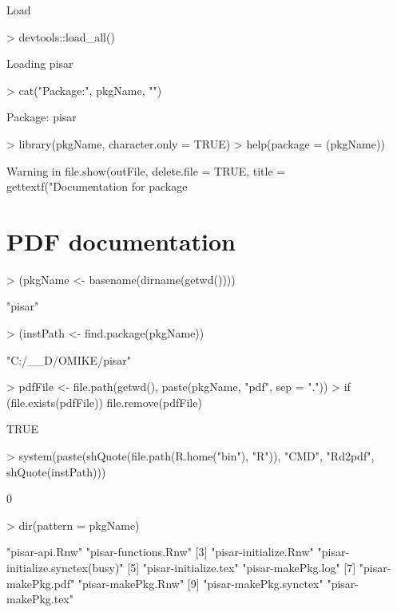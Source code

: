 \documentclass[a4paper,12pt]{article}\usepackage[]{graphicx}\usepackage[]{color}
\begin{document}
Load
\begin{Schunk}
\begin{Sinput}
> devtools::load_all()
\end{Sinput}
\begin{Soutput}
Loading pisar
\end{Soutput}
\begin{Sinput}
> cat("Package:", pkgName, "\n")
\end{Sinput}
\begin{Soutput}
Package: pisar 
\end{Soutput}
\begin{Sinput}
> library(pkgName, character.only = TRUE)
> help(package = (pkgName))
\end{Sinput}
\begin{Soutput}
Warning in file.show(outFile, delete.file = TRUE, title = gettextf("Documentation for package %s", : '"C:\Program Files (x86)\EmEditor\EmEditor.exe"' not found
\end{Soutput}
\end{Schunk}

\section{PDF documentation}

\begin{Schunk}
\begin{Sinput}
> (pkgName <- basename(dirname(getwd())))
\end{Sinput}
\begin{Soutput}
[1] "pisar"
\end{Soutput}
\begin{Sinput}
> (instPath <- find.package(pkgName))
\end{Sinput}
\begin{Soutput}
[1] "C:/__D/OMIKE/pisar"
\end{Soutput}
\begin{Sinput}
> pdfFile <- file.path(getwd(), paste(pkgName, "pdf", sep = "."))
> if (file.exists(pdfFile)) file.remove(pdfFile)
\end{Sinput}
\begin{Soutput}
[1] TRUE
\end{Soutput}
\begin{Sinput}
> system(paste(shQuote(file.path(R.home("bin"), "R")), "CMD", "Rd2pdf", shQuote(instPath)))
\end{Sinput}
\begin{Soutput}
[1] 0
\end{Soutput}
\begin{Sinput}
> dir(pattern = pkgName)
\end{Sinput}
\begin{Soutput}
 [1] "pisar-api.Rnw"                  "pisar-functions.Rnw"           
 [3] "pisar-initialize.Rnw"           "pisar-initialize.synctex(busy)"
 [5] "pisar-initialize.tex"           "pisar-makePkg.log"             
 [7] "pisar-makePkg.pdf"              "pisar-makePkg.Rnw"             
 [9] "pisar-makePkg.synctex"          "pisar-makePkg.tex"             
\end{Soutput}
\end{Schunk}
\end{document}

